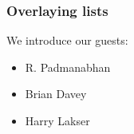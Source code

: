 \documentclass{beamer}
\begin{document}
\begin{frame}
\frametitle{Overlaying lists}

We introduce our guests:
\begin{itemize}[<+->]
\item R. Padmanabhan
\item Brian Davey
\item Harry Lakser
\end{itemize}
\end{frame}
\end{document}
